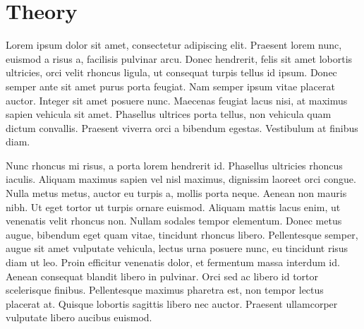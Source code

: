 \documentclass[../main.tex]{subfiles}
\begin{document}
\section{Theory}

    Lorem ipsum dolor sit amet, consectetur adipiscing elit. Praesent lorem nunc, euismod a risus a,
    facilisis pulvinar arcu. Donec hendrerit, felis sit amet lobortis ultricies, orci velit rhoncus 
    ligula, ut consequat turpis tellus id ipsum. Donec semper ante sit amet purus porta feugiat. 
    Nam semper ipsum vitae placerat auctor. Integer sit amet posuere nunc. Maecenas feugiat lacus 
    nisi, at maximus sapien vehicula sit amet. Phasellus ultrices porta tellus, non vehicula quam 
    dictum convallis. Praesent viverra orci a bibendum egestas. Vestibulum at finibus diam.

    Nunc rhoncus mi risus, a porta lorem hendrerit id. Phasellus ultricies rhoncus iaculis. Aliquam 
    maximus sapien vel nisl maximus, dignissim laoreet orci congue. Nulla metus metus, auctor eu turpis 
    a, mollis porta neque. Aenean non mauris nibh. Ut eget tortor ut turpis ornare euismod. Aliquam 
    mattis lacus enim, ut venenatis velit rhoncus non. Nullam sodales tempor elementum. Donec metus 
    augue, bibendum eget quam vitae, tincidunt rhoncus libero. Pellentesque semper, augue sit amet 
    vulputate vehicula, lectus urna posuere nunc, eu tincidunt risus diam ut leo. Proin efficitur 
    venenatis dolor, et fermentum massa interdum id. Aenean consequat blandit libero in pulvinar. Orci 
    sed ac libero id tortor scelerisque finibus. Pellentesque maximus pharetra est, non tempor lectus 
    placerat at. Quisque lobortis sagittis libero nec auctor. Praesent ullamcorper vulputate libero
    aucibus euismod. 
    
\end{document}
